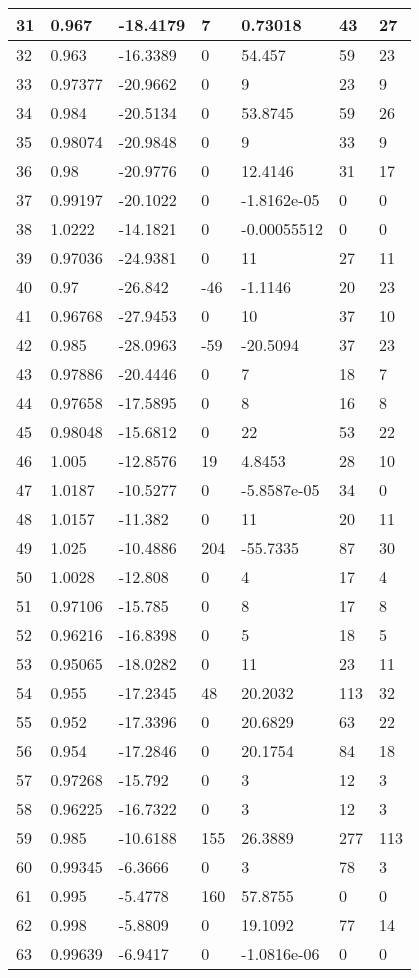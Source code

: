 \begin{tabular}{|l|l|l|l|l|l|l|}
31&0.967&-18.4179&7&0.73018&43&27\\\hline
32&0.963&-16.3389&0&54.457&59&23\\\hline
33&0.97377&-20.9662&0&9&23&9\\\hline
34&0.984&-20.5134&0&53.8745&59&26\\\hline
35&0.98074&-20.9848&0&9&33&9\\\hline
36&0.98&-20.9776&0&12.4146&31&17\\\hline
37&0.99197&-20.1022&0&-1.8162e-05&0&0\\\hline
38&1.0222&-14.1821&0&-0.00055512&0&0\\\hline
39&0.97036&-24.9381&0&11&27&11\\\hline
40&0.97&-26.842&-46&-1.1146&20&23\\\hline
41&0.96768&-27.9453&0&10&37&10\\\hline
42&0.985&-28.0963&-59&-20.5094&37&23\\\hline
43&0.97886&-20.4446&0&7&18&7\\\hline
44&0.97658&-17.5895&0&8&16&8\\\hline
45&0.98048&-15.6812&0&22&53&22\\\hline
46&1.005&-12.8576&19&4.8453&28&10\\\hline
47&1.0187&-10.5277&0&-5.8587e-05&34&0\\\hline
48&1.0157&-11.382&0&11&20&11\\\hline
49&1.025&-10.4886&204&-55.7335&87&30\\\hline
50&1.0028&-12.808&0&4&17&4\\\hline
51&0.97106&-15.785&0&8&17&8\\\hline
52&0.96216&-16.8398&0&5&18&5\\\hline
53&0.95065&-18.0282&0&11&23&11\\\hline
54&0.955&-17.2345&48&20.2032&113&32\\\hline
55&0.952&-17.3396&0&20.6829&63&22\\\hline
56&0.954&-17.2846&0&20.1754&84&18\\\hline
57&0.97268&-15.792&0&3&12&3\\\hline
58&0.96225&-16.7322&0&3&12&3\\\hline
59&0.985&-10.6188&155&26.3889&277&113\\\hline
60&0.99345&-6.3666&0&3&78&3\\\hline
61&0.995&-5.4778&160&57.8755&0&0\\\hline
62&0.998&-5.8809&0&19.1092&77&14\\\hline
63&0.99639&-6.9417&0&-1.0816e-06&0&0\\\hline

\end{tabular}
